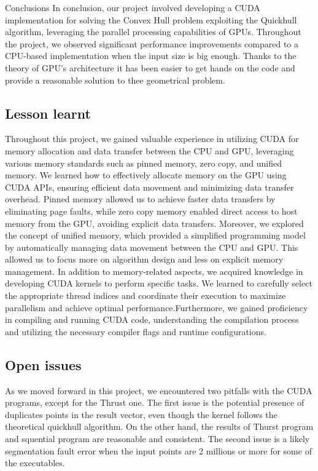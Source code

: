 \documentclass[a4paper,oneside,11pt,DIV12,headsepline,footexclude,headexclude]{scrartcl}
\begin{document}
\begin{section}{Conclusions}
In conclusion, our project involved developing a CUDA implementation for solving the Convex Hull problem exploiting the Quickhull algorithm, leveraging the parallel processing capabilities of GPUs. Throughout the project, we observed significant performance improvements compared to a CPU-based implementation when the input size is big enough. Thanks to the theory of GPU's architecture it has been easier to get hands on the code and provide a reasonable solution to thee geometrical problem.
\subsection{Lesson learnt}
Throughout this project, we gained valuable experience in utilizing CUDA for memory allocation and data transfer between the CPU and GPU, leveraging various memory standards such as pinned memory, zero copy, and unified memory.
We learned how to effectively allocate memory on the GPU using CUDA APIs, ensuring efficient data movement and minimizing data transfer overhead. Pinned memory allowed us to achieve faster data transfers by eliminating page faults, while zero copy memory enabled direct access to host memory from the GPU, avoiding explicit data transfers.
Moreover, we explored the concept of unified memory, which provided a simplified programming model by automatically managing data movement between the CPU and GPU. This allowed us to focus more on algorithm design and less on explicit memory management.
In addition to memory-related aspects, we acquired knowledge in developing CUDA kernels to perform specific tasks. We learned to carefully select the appropriate thread indices and coordinate their execution to maximize parallelism and achieve optimal performance.Furthermore, we gained proficiency in compiling and running CUDA code, understanding the compilation process and utilizing the necessary compiler flags and runtime configurations.
\subsection{Open issues}
As we moved forward in this project, we encountered two pitfalls with the CUDA programs, except for the Thrust one. The first issue is the potential presence of duplicates points in the result vector, even though the kernel follows the theoretical quickhull algorithm. On the other hand, the results of Thurst program and squential program are reasonable and consistent. The second issue is a likely segmentation fault error when the input points are 2 millions or more for some of the executables.  

\end{section}
\end{document}
